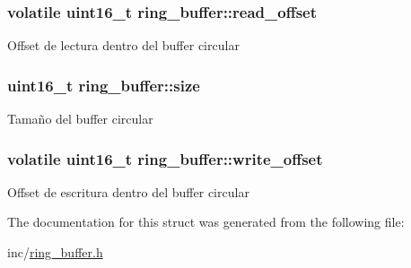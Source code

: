 \subsubsection[{\texorpdfstring{read\+\_\+offset}{read_offset}}]{\setlength{\rightskip}{0pt plus 5cm}volatile uint16\+\_\+t ring\+\_\+buffer\+::read\+\_\+offset}\hypertarget{structring__buffer_ac5ac57ce34ad5f9e2fb7d5f15484131f}{}\label{structring__buffer_ac5ac57ce34ad5f9e2fb7d5f15484131f}
Offset de lectura dentro del buffer circular 
\subsubsection[{\texorpdfstring{size}{size}}]{\setlength{\rightskip}{0pt plus 5cm}uint16\+\_\+t ring\+\_\+buffer\+::size}\hypertarget{structring__buffer_a6d5d1e99514e08157b9f8f7549892ee6}{}\label{structring__buffer_a6d5d1e99514e08157b9f8f7549892ee6}
Tamaño del buffer circular 
\subsubsection[{\texorpdfstring{write\+\_\+offset}{write_offset}}]{\setlength{\rightskip}{0pt plus 5cm}volatile uint16\+\_\+t ring\+\_\+buffer\+::write\+\_\+offset}\hypertarget{structring__buffer_a39755539dd29fbbbdd184f60e41500eb}{}\label{structring__buffer_a39755539dd29fbbbdd184f60e41500eb}
Offset de escritura dentro del buffer circular 

The documentation for this struct was generated from the following file\+:\begin{DoxyCompactItemize}
\item 
inc/\hyperlink{ring__buffer_8h}{ring\+\_\+buffer.\+h}\end{DoxyCompactItemize}
